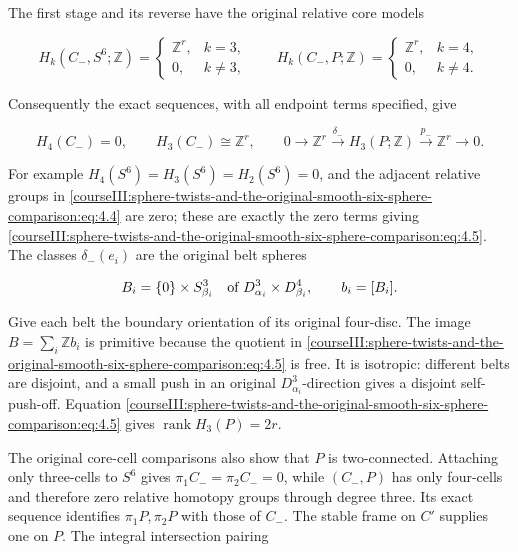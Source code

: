 The first stage and its reverse have the original relative core models

\begin{equation}
H_k(C_-,S^6;\mathbb Z)=
 \begin{cases}\mathbb Z^r,&k=3,\\0,&k\ne3,\end{cases}
 \qquad
 H_k(C_-,P;\mathbb Z)=
 \begin{cases}\mathbb Z^r,&k=4,\\0,&k\ne4.\end{cases}
 \label{courseIII:sphere-twists-and-the-original-smooth-six-sphere-comparison:eq:4.4}
\end{equation}

Consequently the exact sequences, with all endpoint terms specified, give

\begin{equation}
H_4(C_-)=0,\qquad H_3(C_-)\cong\mathbb Z^r,\qquad
 0\longrightarrow\mathbb Z^r
   \xrightarrow{\delta_-}H_3(P;\mathbb Z)
   \xrightarrow{p_-}\mathbb Z^r\longrightarrow0 .
 \label{courseIII:sphere-twists-and-the-original-smooth-six-sphere-comparison:eq:4.5}
\end{equation}

For example \(H_4(S^6)=H_3(S^6)=H_2(S^6)=0\), and the adjacent relative groups in \eqref{courseIII:sphere-twists-and-the-original-smooth-six-sphere-comparison:eq:4.4} are zero; these are exactly the zero terms giving \eqref{courseIII:sphere-twists-and-the-original-smooth-six-sphere-comparison:eq:4.5}. The classes \(\delta_-(e_i)\) are the original belt spheres

\begin{equation}
B_i=\{0\}\times S^3_{\beta_i}
 \quad\hbox{of }D^3_{\alpha_i}\times D^4_{\beta_i},
 \qquad b_i=[B_i].
 \label{courseIII:sphere-twists-and-the-original-smooth-six-sphere-comparison:eq:4.6}
\end{equation}

Give each belt the boundary orientation of its original four-disc. The image \(B=\sum_i\mathbb Zb_i\) is primitive because the quotient in \eqref{courseIII:sphere-twists-and-the-original-smooth-six-sphere-comparison:eq:4.5} is free. It is isotropic: different belts are disjoint, and a small push in an original \(D^3_{\alpha_i}\)-direction gives a disjoint self-push-off. Equation \eqref{courseIII:sphere-twists-and-the-original-smooth-six-sphere-comparison:eq:4.5} gives \(\operatorname{rank}H_3(P)=2r\).

The original core-cell comparisons also show that \(P\) is two-connected. Attaching only three-cells to \(S^6\) gives \(\pi_1C_-=\pi_2C_-=0\), while \((C_-,P)\) has only four-cells and therefore zero relative homotopy groups through degree three. Its exact sequence identifies \(\pi_1P,\pi_2P\) with those of \(C_-\). The stable frame on \(C'\) supplies one on \(P\). The integral intersection pairing

